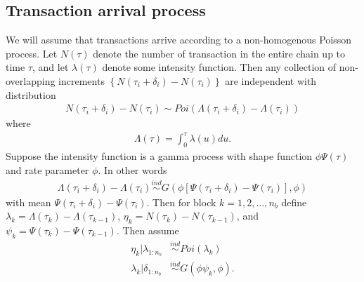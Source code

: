 \documentclass{article}
\begin{document}
\subsection{Transaction arrival process}
We will assume that transactions arrive according to a non-homogenous Poisson process. Let $N(\tau)$ denote the number of transaction in the entire chain up to time $\tau$, and let $\lambda(\tau)$ denote some intensity function. Then any collection of non-overlapping increments $\left\{N(\tau_i + \delta_i) - N(\tau_i)\right\}$ are independent with distribution
\begin{align*}
N(\tau_i + \delta_i) - N(\tau_i) \sim Poi(\Lambda(\tau_i + \delta_i) - \Lambda(\tau_i))
\end{align*}
where 
\begin{align*}
\Lambda(\tau) = \int_0^\tau \lambda(u)du.
\end{align*}
Suppose the intensity function is a gamma process with shape function $\phi\Psi(\tau)$ and rate parameter $\phi$. In other words
\begin{align*}
\Lambda(\tau_i + \delta_i) - \Lambda(\tau_i) \stackrel{ind}{\sim} G(\phi[\Psi(\tau_i + \delta_i) - \Psi(\tau_i)], \phi)
\end{align*}
with mean $\Psi(\tau_i + \delta_i) - \Psi(\tau_i)$. Then for block $k=1,2,\dots,n_{b}$ define $\lambda_k = \Lambda(\tau_k) - \Lambda(\tau_{k-1})$, $\eta_k = N(\tau_k) - N(\tau_{k-1})$, and $\psi_k = \Psi(\tau_k) - \Psi(\tau_{k-1})$. Then assume
\begin{align*}
\eta_k | \lambda_{1:n_{b}} &\stackrel{ind}{\sim} Poi(\lambda_k)\\
\lambda_k|\delta_{1:n_{b}} &\stackrel{ind}{\sim} G(\phi\psi_k, \phi).
\end{align*}
\end{document}
